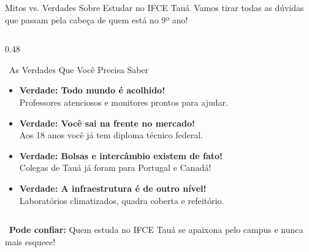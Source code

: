 \begin{frame}{Mitos vs. Verdades Sobre Estudar no IFCE Tauá}{\faCheckSquare\ Vamos tirar todas as dúvidas que passam pela cabeça de quem está no 9º ano!}
\begin{columns}[t]
    \begin{column}{0.48\textwidth}
      \begin{greencard}{\faCheckCircle\ As Verdades Que Você Precisa Saber}
        \tiny
        \begin{itemize}\setlength{\itemsep}{0.18em}
          \item \textbf{Verdade: Todo mundo é acolhido!} \\
          \textcolor{TechDark}{Professores atenciosos e monitores prontos para ajudar.}
          \item \textbf{Verdade: Você sai na frente no mercado!} \\
          \textcolor{TechDark}{Aos 18 anos você já tem diploma técnico federal.}
          \item \textbf{Verdade: Bolsas e intercâmbio existem de fato!} \\
          \textcolor{TechDark}{Colegas de Tauá já foram para Portugal e Canadá!}
          \item \textbf{Verdade: A infraestrutura é de outro nível!} \\
          \textcolor{TechDark}{Laboratórios climatizados, quadra coberta e refeitório.}
        \end{itemize}
      \end{greencard}
    \end{column}
  \end{columns}
  
  \vspace{0.08cm}
  \begin{statcard}
    \tiny \textcolor{IFCEDarkGreen}{\faHeart\ \textbf{Pode confiar:} Quem estuda no IFCE Tauá se apaixona pelo campus e nunca mais esquece!}
  \end{statcard}
\end{frame}

